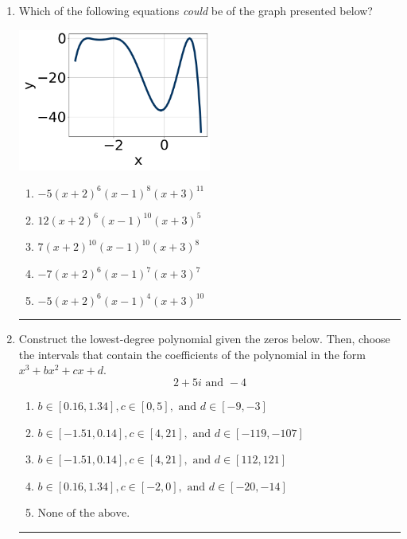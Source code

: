 \documentclass[14pt]{extbook}
\newcommand{\litem}[1]{\item#1\hspace*{-1cm}\rule{\textwidth}{0.4pt}}
\begin{document}
\begin{enumerate}
\litem{
Which of the following equations \textit{could} be of the graph presented below?
\begin{center}
    \includegraphics[width=0.5\textwidth]{../Figures/polyGraphToFunctionCopyA.png}
\end{center}
\begin{enumerate}[label=\Alph*.]
\item \( -5(x + 2)^{6} (x - 1)^{8} (x + 3)^{11} \)
\item \( 12(x + 2)^{6} (x - 1)^{10} (x + 3)^{5} \)
\item \( 7(x + 2)^{10} (x - 1)^{10} (x + 3)^{8} \)
\item \( -7(x + 2)^{6} (x - 1)^{7} (x + 3)^{7} \)
\item \( -5(x + 2)^{6} (x - 1)^{4} (x + 3)^{10} \)

\end{enumerate} }
\litem{
Construct the lowest-degree polynomial given the zeros below. Then, choose the intervals that contain the coefficients of the polynomial in the form $x^3+bx^2+cx+d$.\[ 2 + 5 i \text{ and } -4 \]\begin{enumerate}[label=\Alph*.]
\item \( b \in [0.16, 1.34], c \in [0, 5], \text{ and } d \in [-9, -3] \)
\item \( b \in [-1.51, 0.14], c \in [4, 21], \text{ and } d \in [-119, -107] \)
\item \( b \in [-1.51, 0.14], c \in [4, 21], \text{ and } d \in [112, 121] \)
\item \( b \in [0.16, 1.34], c \in [-2, 0], \text{ and } d \in [-20, -14] \)
\item \( \text{None of the above.} \)


\end{enumerate}}
\end{enumerate}
\end{document}
